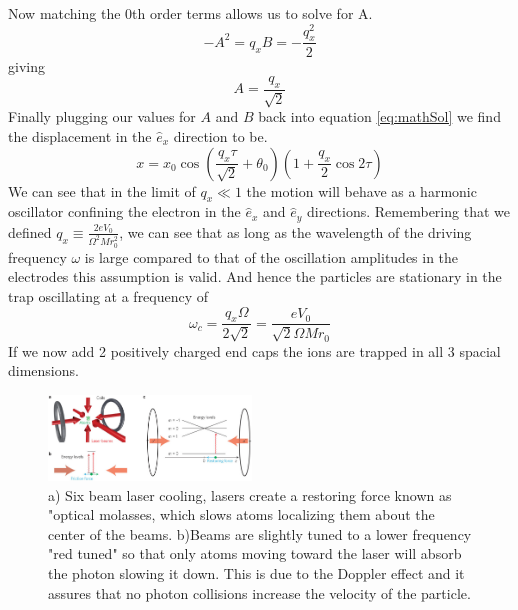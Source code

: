 \documentclass[aps,prb,twocolumn,superscriptaddress]{revtex4-1}
\begin{document}
Now matching the 0th order terms allows us to solve for A.
\begin{equation}
-A^2=q_xB=-\frac{q_x^2}{2}
\end{equation}
giving
\begin{equation}
A=\frac{q_x}{\sqrt{2}}
\end{equation}
Finally plugging our values for $A$ and $B$ back into equation \ref{eq:mathSol} we find the displacement in the $\hat{e}_x$ direction to be.
\begin{equation}
x=x_0\cos\left(\frac{q_x\tau}{\sqrt{2}}+\theta_0\right)\left(1+\frac{q_x}{2}\cos{2\tau}\right)
\end{equation}
We can see that in the limit of $q_x\ll1$ the motion will behave as a harmonic oscillator confining the electron in the $\hat{e}_x$ and $\hat{e}_y$ directions. Remembering that we defined $q_x\equiv\frac{2eV_0}{\Omega^2Mr_0^2}$, we can see that as long as the wavelength of the driving frequency $\omega$ is large compared to that of the oscillation amplitudes in the electrodes this assumption is valid. And hence the particles are stationary in the trap oscillating at a frequency of 
\begin{equation}
\omega_c = \frac{q_x\Omega}{2\sqrt{2}}=\frac{eV_0}{\sqrt{2}\Omega Mr_0}
\end{equation}
If we now add 2 positively charged end caps the ions are trapped in all 3 spacial dimensions. 
\begin{figure}
	\begin{center}
		\includegraphics[width=0.48\textwidth]{laserCooling}
	\end{center}
	\vspace{-2mm}
	\caption{a) Six beam laser cooling, lasers create a restoring force known as "optical molasses, which slows atoms localizing them about the center of the beams. b)Beams are slightly tuned to a lower frequency "red tuned" so that only atoms moving toward the laser will absorb the photon slowing it down. This is due to the Doppler effect and it assures that no photon collisions increase the velocity of the particle.\cite{esteve2013cold}}
	\label{fig:laser}
	\vspace{-3mm}
\end{figure}
\end{document}
